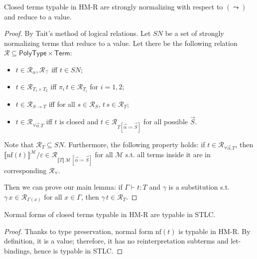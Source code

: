 \begin{theorem}
    Closed terms typable in HM-R are strongly
    normalizing with respect to $(\leadsto)$ and reduce
    to a value.
\end{theorem}
\begin{proof}
    By Tait's method of logical relations. Let $SN$ be a
    set of strongly normalizing terms that reduce to a
    value. Let there be the following relation
    $\mathcal{R}\subseteq
    \mathsf{PolyType}\times\mathsf{Term}$:
    \begin{itemize}
        \item $t\in\mathcal{R}_\alpha,\mathcal{R}_\top$
            iff $t\in SN$;
        \item $t\in\mathcal{R}_{T_1\times T_2}$ iff
            $\pi_i\,t\in\mathcal{R}_{T_i}$ for $i=1,2$;
        \item $t\in\mathcal{R}_{S\to T}$ iff for all
            $s\in\mathcal{R}_S$, $t\,s\in\mathcal{R}_T$;
        \item $t\in\mathcal{R}_{\forall\vec{\alpha}.T}$
            iff $t$ is closed and $t\in \mathcal{R}_{
            T[\vec{\alpha}\coloneqq\vec{S}]}$ for all
            possible $\vec{S}$.
    \end{itemize}

    Note that $\mathcal{R}_T\subseteq SN$. Furthermore,
    the following property holds: if
    $t\in\mathcal{R}_{\forall\vec{\alpha}.T}$, then
    $\llbracket\mathrm{nf}(t)\rrbracket^\mathcal{M}/
    \varepsilon\in\mathcal{R}_{\llbracket T\rrbracket\,
    \mathcal{M}\,[\vec{\alpha}\coloneqq\vec{S}]}$ for
    all $\mathcal{M}$ s.t. all terms inside it are in
    corresponding $\mathcal{R}_\forall$.

    Then we can prove our main lemma: if
    $\Gamma\vdash t:T$ and $\gamma$ is a substitution
    s.t. $\gamma\,x\in\mathcal{R}_{\Gamma(x)}$ for all
    $x\in\Gamma$, then $\gamma\,t\in\mathcal{R}_T$.
\end{proof}

\begin{theorem}
    Normal forms of closed terms typable in HM-R are
    typable in STLC.
\end{theorem}
\begin{proof}
    Thanks to type preservation, normal form
    $\mathrm{nf}(t)$ is typable in HM-R. By definition,
    it is a value; therefore, it has no reinterpretation
    subterms and let-bindings, hence is typable in STLC.
\end{proof}

